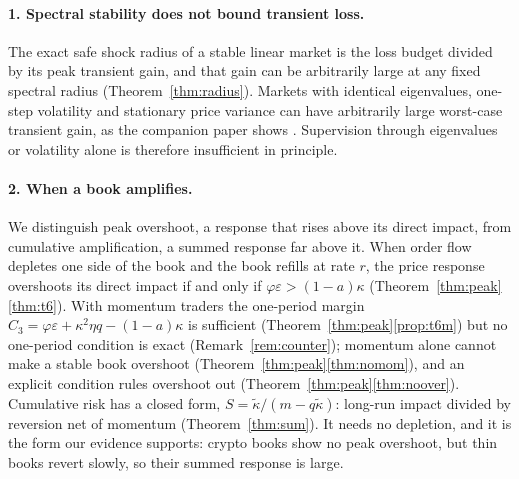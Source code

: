 \documentclass[12pt]{article}
\theoremstyle{definition}
\theoremstyle{remark}
\begin{document}
\paragraph{1. Spectral stability does not bound transient loss.} The exact safe shock radius of a stable linear market is the loss budget divided by its peak transient gain, and that gain can be arbitrarily large at any fixed spectral radius (Theorem~\ref{thm:radius}). Markets with identical eigenvalues, one-step volatility and stationary price variance can have arbitrarily large worst-case transient gain, as the companion paper shows \citep{niroula2026}. Supervision through eigenvalues or volatility alone is therefore insufficient in principle.

\paragraph{2. When a book amplifies.} We distinguish peak overshoot, a response that rises above its direct impact, from cumulative amplification, a summed response far above it. When order flow depletes one side of the book and the book refills at rate $r$, the price response overshoots its direct impact if and only if $\varphi\varepsilon>(1-a)\kappa$ (Theorem~\ref{thm:peak}\ref{thm:t6}). With momentum traders the one-period margin $C_3=\varphi\varepsilon+\kappa^2\eta q-(1-a)\kappa$ is sufficient (Theorem~\ref{thm:peak}\ref{prop:t6m}) but no one-period condition is exact (Remark~\ref{rem:counter}); momentum alone cannot make a stable book overshoot (Theorem~\ref{thm:peak}\ref{thm:nomom}), and an explicit condition rules overshoot out (Theorem~\ref{thm:peak}\ref{thm:noover}). Cumulative risk has a closed form, $S=\tilde\kappa/(m-q\tilde\kappa)$: long-run impact divided by reversion net of momentum (Theorem~\ref{thm:sum}). It needs no depletion, and it is the form our evidence supports: crypto books show no peak overshoot, but thin books revert slowly, so their summed response is large.
\end{document}
